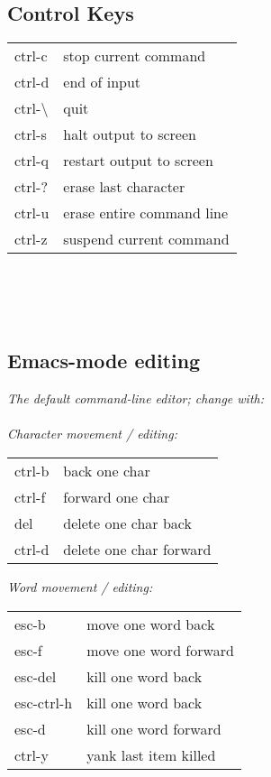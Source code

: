 \subsection*{Control Keys}

{\footnotesize 
\begin{tabular}{l  l}
    ctrl-c & stop current command \\
    ctrl-d & end of input \\ 
    ctrl-\textbackslash & quit \\ 
    ctrl-s & halt output to screen \\ 
    ctrl-q & restart output to screen \\ 
    ctrl-? & erase last character \\ 
    ctrl-u & erase entire command line \\ 
    ctrl-z & suspend current command \\ 
\end{tabular}}

\\
\\
\\


\subsection*{Emacs-mode editing}
\textit{The default command-line editor; change with:}\\
\\

\textit{Character movement / editing:}\\
\begin{tabular}{l  l}
    ctrl-b      & back one char \\
    ctrl-f      & forward one char \\
    del         & delete one char back \\
    ctrl-d      & delete one char forward \\
\end{tabular}

\textit{Word movement / editing:}\\
\begin{tabular}{l  l}
    esc-b       & move one word back \\
    esc-f       & move one word forward \\
    esc-del     & kill one word back \\
    esc-ctrl-h  & kill one word back \\
    esc-d       & kill one word forward \\
    ctrl-y      & yank last item killed 
\end{tabular}

